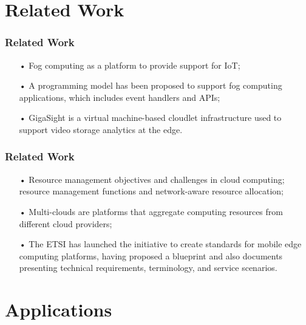 \documentclass[10pt, pdf, xcolor=pdftex, dvipsnames, table]{beamer}
\begin{document}
\section[Related Work]{Related Work}

\begin{frame}
	\tableofcontents[currentsection]
\end{frame}

\begin{frame}
	\frametitle{Related Work}
 	\begin{block}{}
 		\begin{itemize}
 		    \item[•] Fog computing as a platform to provide support  for IoT;\newline
 		    \item[•] A programming model has been proposed to support fog computing applications, which includes event handlers and APIs;\newline
 		    \item[•] GigaSight is a virtual machine-based cloudlet infrastructure used to support video storage analytics at the edge.
 		\end{itemize}
 	\end{block}
\end{frame}

\begin{frame}
	\frametitle{Related Work}
 	\begin{block}{}
 		\begin{itemize}
 		    \item[•] Resource management objectives and challenges in cloud computing; resource management functions and network-aware resource allocation;\newline
 		    \item[•] Multi-clouds are platforms that aggregate computing resources from different cloud providers;\newline
 		    \item[•] The ETSI has launched the initiative to create standards for mobile edge computing platforms, having proposed a blueprint and also documents presenting technical requirements, terminology, and service scenarios.
 		\end{itemize}
 	\end{block}
\end{frame}

\section[Applications]{Applications}
\end{document}
